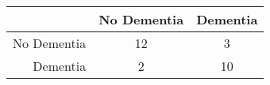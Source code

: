 \begin{table}[ht]
\centering
\begin{tabular}{r|c|c}
  \hline
 & No Dementia & Dementia \\ 
  \hline
No Dementia & 12 & 3 \\ 
  Dementia & 2 & 10 \\ 
   \hline
\end{tabular}
\end{table}
